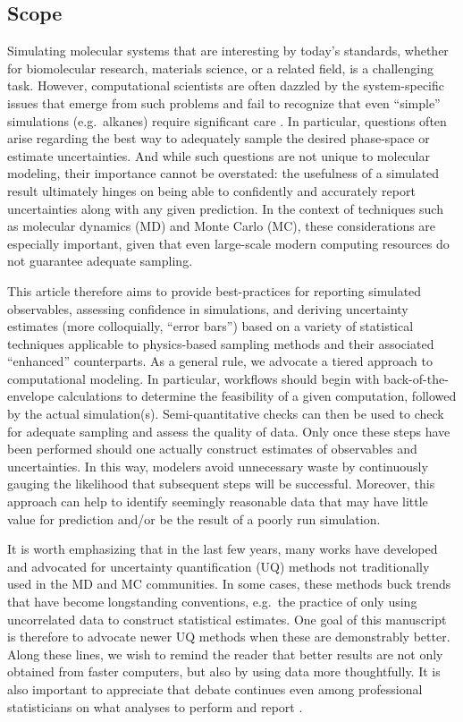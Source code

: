 \subsection{Scope}

Simulating molecular systems that are interesting by today's standards, whether for biomolecular research, materials science, or a related field, is a challenging task.
However, computational scientists are often dazzled by the system-specific issues that emerge from such problems and fail to recognize that even ``simple'' simulations (e.g.\ alkanes) require significant care \cite{Schappals2017}.  In particular, questions often arise regarding the best way to adequately sample the desired phase-space or estimate uncertainties.  And while such questions are not unique to molecular modeling, their importance cannot be overstated: the usefulness of a simulated result ultimately hinges on being able to confidently and accurately report uncertainties along with any given prediction.  In the context of techniques such as molecular dynamics (MD) and Monte Carlo (MC), these considerations are especially important, given that even large-scale modern computing resources do not guarantee adequate sampling.

This article therefore aims to provide best-practices for reporting simulated observables, assessing confidence in simulations, and deriving uncertainty estimates (more colloquially, ``error bars'') based on a variety of statistical techniques applicable to physics-based sampling methods and their associated ``enhanced'' counterparts.  As a general rule, we advocate a tiered approach to computational modeling.  In particular, workflows should begin with back-of-the-envelope calculations to determine the feasibility of a given computation, followed by the actual simulation(s).  Semi-quantitative checks can then be used to check for adequate sampling and assess the quality of data.  Only once these steps have been performed should one actually construct estimates of observables and uncertainties.  In this way, modelers avoid unnecessary waste by continuously gauging the likelihood that subsequent steps will be successful.  Moreover, this approach can help to identify seemingly reasonable data that may have little value for prediction and/or be the result of a poorly run simulation.

It is worth emphasizing that in the last few years, many works have developed and advocated for uncertainty quantification (UQ) methods not traditionally used in the MD and MC communities.  In some cases, these methods buck trends that have become longstanding conventions, e.g.\ the practice of only using uncorrelated data to construct statistical estimates.  One goal of this manuscript is therefore to advocate newer UQ methods when these are demonstrably better.  Along these lines, we wish to remind the reader that better results are not only obtained from faster computers, but also by using data more thoughtfully.
It is also important to appreciate that debate continues even among professional statisticians on what analyses to perform and report \cite{Leek2017}.

